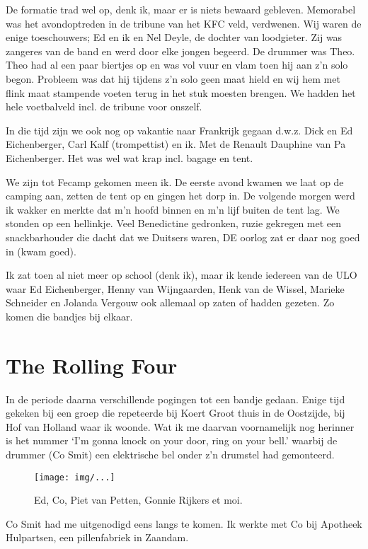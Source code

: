 \documentclass[10pt,twoside,openright]{memoir}
\begin{document}
De formatie trad wel op, denk ik, maar er is niets bewaard gebleven. Memorabel was het avondoptreden in de tribune van het KFC veld, verdwenen. Wij waren de enige toeschouwers; Ed en ik en Nel Deyle, de dochter van loodgieter. Zij was zangeres van de band en werd door elke jongen begeerd. De drummer was Theo. Theo had al een paar biertjes op en was vol vuur en vlam toen hij aan z’n solo begon. Probleem was dat hij tijdens z’n solo geen maat hield en wij hem met flink maat stampende voeten terug in het stuk moesten brengen. We hadden het hele voetbalveld incl. de tribune voor onszelf. 

In die tijd zijn we ook nog op vakantie naar Frankrijk gegaan d.w.z. Dick en Ed Eichenberger, Carl Kalf (trompettist) en ik. Met de Renault Dauphine van Pa Eichenberger. Het was wel wat krap incl. bagage en tent. 

We zijn tot Fecamp gekomen meen ik. De eerste avond kwamen we laat op de camping aan, zetten de tent op en gingen het dorp in. De volgende morgen werd ik wakker en merkte dat m’n hoofd binnen en m'n lijf buiten de tent lag. We stonden op een hellinkje. Veel Benedictine gedronken, ruzie gekregen met een snackbarhouder die dacht dat we Duitsers waren, DE oorlog zat er daar nog goed in (kwam goed). 

Ik zat toen al niet meer op school (denk ik), maar ik kende iedereen van de ULO waar Ed Eichenberger, Henny van Wijngaarden, Henk van de Wissel, Marieke Schneider en Jolanda Vergouw ook allemaal op zaten of hadden gezeten. Zo komen die bandjes bij elkaar.

\chapter{The Rolling Four} %
\label{cha:rollingfour}

In de periode daarna verschillende pogingen tot een bandje gedaan. Enige tijd gekeken bij een groep die repeteerde bij Koert Groot thuis in de Oostzijde, bij Hof van Holland waar ik woonde. Wat ik me daarvan voornamelijk nog herinner is het nummer ‘I’m gonna knock on your door, ring on your bell.’ waarbij de drummer (Co Smit) een elektrische bel onder z’n drumstel had gemonteerd.

\begin{figure}[t]
\texttt{[image: img/...]}
\caption{Ed, Co, Piet van Petten, Gonnie Rijkers et moi.}
\end{figure}

Co Smit had me uitgenodigd eens langs te komen. Ik werkte met Co bij Apotheek Hulpartsen, een pillenfabriek in Zaandam.
\end{document}
